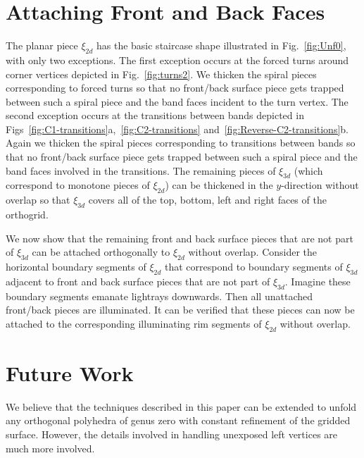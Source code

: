 \documentclass[11pt]{article}
\begin{document}
\section{Attaching Front and Back Faces}
\label{sec:frontback}
The planar piece $\xi_{2d}$ has the basic staircase shape illustrated in Fig.~\ref{fig:Unf0}, with only two exceptions.
The first exception occurs at the forced turns around corner vertices depicted in Fig.~\ref{fig:turns2}. We 
thicken the spiral pieces corresponding to forced turns so that no front/back surface piece gets trapped 
between such a spiral piece and the band faces incident to the turn  vertex. 
The second exception occurs at the transitions between bands depicted in 
Figs~\ref{fig:C1-transitions}a,~\ref{fig:C2-transitions} and~\ref{fig:Reverse-C2-transitions}b. Again we 
thicken the spiral pieces corresponding to transitions between bands so that no front/back surface piece 
gets trapped between such a spiral piece and the band faces involved in the transitions. 
The remaining  pieces of $\xi_{3d}$ (which correspond to monotone pieces of $\xi_{2d}$) can be thickened in the $y$-direction without overlap so that $\xi_{3d}$ covers all of the top, bottom, left and right faces of the orthogrid.


We now show that the remaining front and back surface pieces that are not part of $\xi_{3d}$ 
can be attached orthogonally to $\xi_{2d}$ without overlap.
Consider the horizontal boundary segments of $\xi_{2d}$ that correspond to boundary segments of $\xi_{3d}$ adjacent to front and back surface pieces that are not part of $\xi_{3d}$.  Imagine these boundary segments emanate lightrays downwards. Then all unattached front/back pieces are illuminated. It can be verified that these pieces can now be attached to the corresponding illuminating rim segments of $\xi_{2d}$ without overlap. 

\section{Future Work}
We believe that the techniques described in this paper can be extended to unfold any orthogonal polyhedra of genus zero with constant refinement of the gridded surface. However, the details involved in handling unexposed left vertices are much more involved. 
\end{document}
